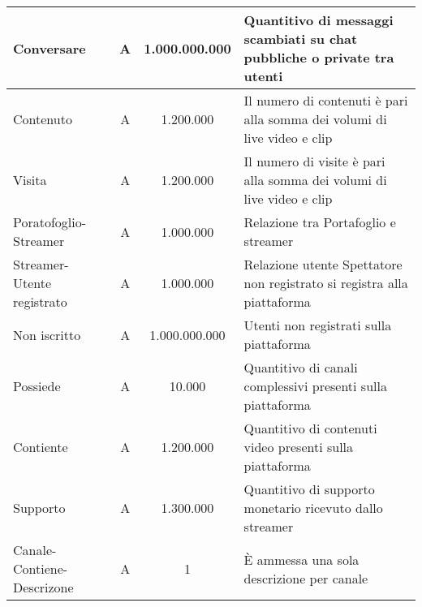 \begin{longtable}{ |l|c|c|p{6.2cm}|}
  Conversare & A &1.000.000.000 & Quantitivo di messaggi scambiati su chat pubbliche o private tra utenti\\\hline
  Contenuto & A & 1.200.000 & Il numero di contenuti è pari alla somma dei volumi di live video e clip  \\\hline %
  Visita & A & 1.200.000& Il numero di visite è pari alla somma dei volumi di live video e clip \\\hline %
  Poratofoglio-Streamer & A &1.000.000 & Relazione tra Portafoglio e streamer \\\hline 
  Streamer-Utente registrato & A & 1.000.000 & Relazione utente Spettatore non registrato si registra alla piattaforma\\\hline
  Non iscritto & A & 1.000.000.000 & Utenti non registrati sulla piattaforma\\\hline
  Possiede & A & 10.000 &Quantitivo di canali complessivi presenti sulla piattaforma \\\hline
  Contiente & A & 1.200.000&Quantitivo di contenuti video presenti sulla piattaforma \\\hline
  Supporto & A & 1.300.000 &Quantitivo di supporto monetario ricevuto dallo streamer \\\hline
  Canale-Contiene-Descrizone & A & 1 &È ammessa una sola descrizione per canale \\\hline

\end{longtable}
\normalsize

